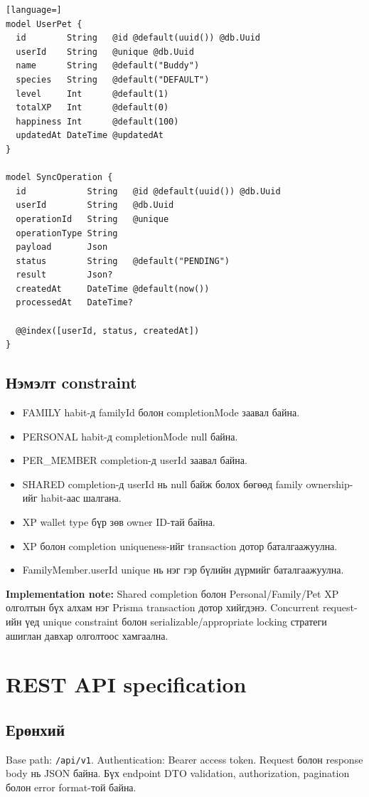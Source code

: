 \documentclass[12pt,a4paper,oneside]{report}
\begin{document}
\begin{lstlisting}[language=]
model UserPet {
  id        String   @id @default(uuid()) @db.Uuid
  userId    String   @unique @db.Uuid
  name      String   @default("Buddy")
  species   String   @default("DEFAULT")
  level     Int      @default(1)
  totalXP   Int      @default(0)
  happiness Int      @default(100)
  updatedAt DateTime @updatedAt
}

model SyncOperation {
  id            String   @id @default(uuid()) @db.Uuid
  userId        String   @db.Uuid
  operationId   String   @unique
  operationType String
  payload       Json
  status        String   @default("PENDING")
  result        Json?
  createdAt     DateTime @default(now())
  processedAt   DateTime?

  @@index([userId, status, createdAt])
}
\end{lstlisting}

\section{Нэмэлт constraint}
\begin{itemize}
  \item FAMILY habit-д familyId болон completionMode заавал байна.
  \item PERSONAL habit-д completionMode null байна.
  \item PER\_MEMBER completion-д userId заавал байна.
  \item SHARED completion-д userId нь null байж болох бөгөөд family ownership-ийг habit-аас шалгана.
  \item XP wallet type бүр зөв owner ID-тай байна.
  \item XP болон completion uniqueness-ийг transaction дотор баталгаажуулна.
  \item FamilyMember.userId unique нь нэг гэр бүлийн дүрмийг баталгаажуулна.
\end{itemize}

\textbf{Implementation note:} Shared completion болон Personal/Family/Pet XP олголтын бүх алхам нэг Prisma transaction дотор хийгдэнэ. Concurrent request-ийн үед unique constraint болон serializable/appropriate locking стратеги ашиглан давхар олголтоос хамгаална.

\chapter{REST API specification}

\section{Ерөнхий}
Base path: \texttt{/api/v1}. Authentication: Bearer access token. Request болон response body нь JSON байна. Бүх endpoint DTO validation, authorization, pagination болон error format-той байна.
\end{document}
